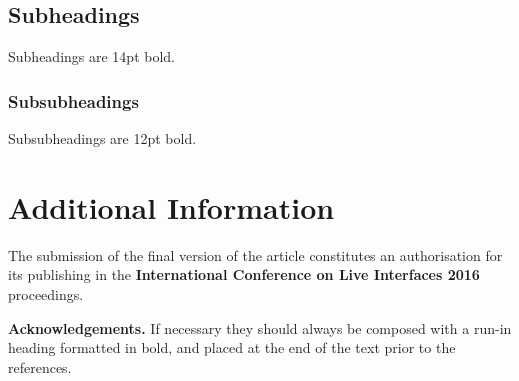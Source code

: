 \documentclass[]{article}
\begin{document}
\subsection{Subheadings}

Subheadings are 14pt bold.

\subsubsection{Subsubheadings}

Subsubheadings are 12pt bold.

\section{Additional Information}\label{additional-information}

The submission of the final version of the article constitutes an authorisation for its publishing in the \textbf{International Conference on Live Interfaces 2016} proceedings.

\textbf{Acknowledgements.} If necessary they should always be composed with a run-in heading formatted in bold, and placed at the end of the text prior to the references.

  
  
\end{document}
